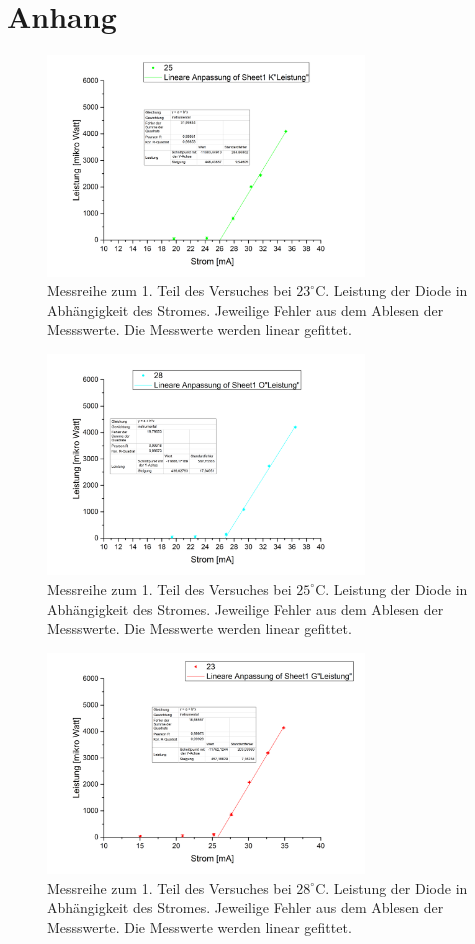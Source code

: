 \documentclass[a4paper,10pt]{scrartcl} %
\begin{document}
\section{Anhang}
\label{sec:Anhang}
\begin{figure}
\caption{Messreihe zum 1. Teil des Versuches bei $23 ^\circ{\text{C}}$. Leistung der Diode in Abhängigkeit des Stromes. Jeweilige Fehler aus dem Ablesen der Messswerte. Die Messwerte werden linear gefittet.}
\label{fig:1_25}
\includegraphics[width = 0.75\textwidth]{Bilder/25.png}
\end{figure}
\begin{figure}
\caption{Messreihe zum 1. Teil des Versuches bei $25 ^\circ{\text{C}}$. Leistung der Diode in Abhängigkeit des Stromes. Jeweilige Fehler aus dem Ablesen der Messswerte. Die Messwerte werden linear gefittet.}
\label{fig:1_28}
\includegraphics[width = 0.75\textwidth]{Bilder/28.png}
\end{figure}
\begin{figure}
\caption{Messreihe zum 1. Teil des Versuches bei $28 ^\circ{\text{C}}$. Leistung der Diode in Abhängigkeit des Stromes. Jeweilige Fehler aus dem Ablesen der Messswerte. Die Messwerte werden linear gefittet.}
\label{fig:1_23}
\includegraphics[width = 0.75\textwidth]{Bilder/23.png}
\end{figure}
\end{document}
